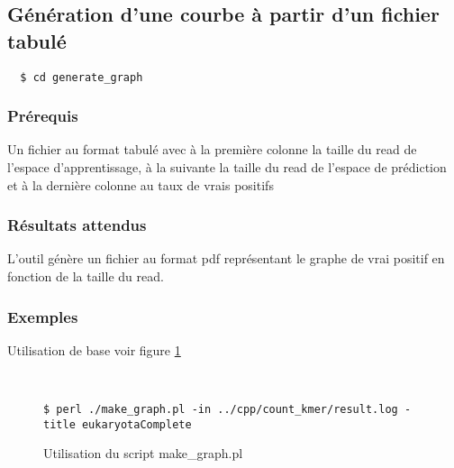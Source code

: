 \subsection{Génération d'une courbe à partir d'un fichier tabulé}
\label{graph2}

\begin{verbatim}
  $ cd generate_graph
\end{verbatim}
\subsubsection{Prérequis}

Un fichier au format tabulé avec à la première colonne
la taille du read de l'espace d'apprentissage, à la suivante 
la taille du read de l'espace de prédiction et à la dernière colonne
au taux de vrais positifs

\subsubsection{Résultats attendus}

L'outil génère un fichier au format pdf représentant le graphe de vrai positif
en fonction de la taille du read. 


\subsubsection{Exemples}
Utilisation de base voir figure \ref{makgraph}

~\\
\begin{figure}[H]
\begin{center}
\begin{verbatim}
$ perl ./make_graph.pl -in ../cpp/count_kmer/result.log -title eukaryotaComplete
\end{verbatim}
\end{center}
\caption{\label{makgraph}Utilisation du script make\_graph.pl}
\end{figure}
~\\
